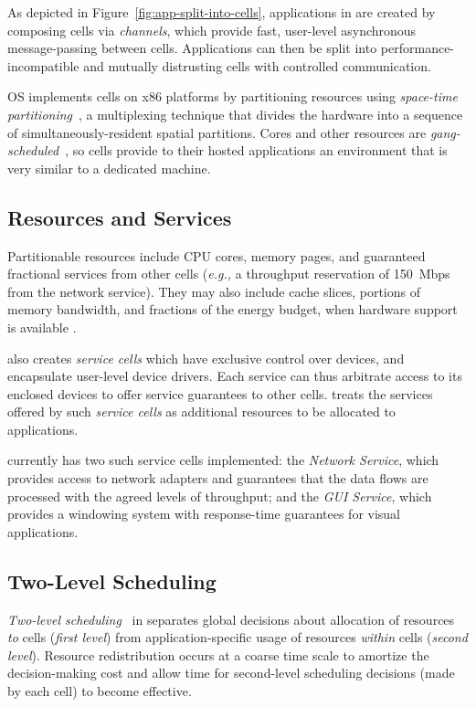 As depicted in Figure~\ref{fig:app-split-into-cells}, applications
in \tess are created by composing cells via \emph{channels}, which
provide fast, user-level asynchronous message-passing between cells.
Applications can then be split into performance-incompatible and
mutually distrusting cells with controlled communication. 


\tess OS implements cells on x86 platforms by partitioning resources
using \emph{space-time partitioning}~\cite{rushby99,lei03}, 
a multiplexing technique that divides the hardware into a sequence of
simultaneously-resident spatial partitions. 
Cores and other resources are
\textit{gang-scheduled}~\cite{gangsched1982,gangschedpatent}, so
cells provide to their hosted applications an environment that is very
similar to a dedicated machine.

\subsection{Resources and Services} \label{sec:soa} 
Partitionable resources include CPU cores, memory pages, and guaranteed
fractional services from other cells (\emph{e.g.,} a throughput reservation of 150~Mbps
from the network service).  
They may also include cache slices, portions of memory bandwidth, and fractions
of the energy budget, when hardware support is available
\cite{akesson07,lee08memqos,paolieri09,sanchez11}.

\tess also creates \emph{service cells} which have exclusive
control over devices, and encapsulate user-level device drivers. 
Each service can thus arbitrate access to its
enclosed devices to offer service guarantees to
other cells. \tess treats the services
offered by such \emph{service cells} as additional resources to be allocated to applications.

\tess currently has two such service cells implemented:
the \emph{Network Service}, which provides access to network adapters and
guarantees that the data flows are processed with the agreed levels of
throughput; and the \emph{GUI Service}, which provides a windowing system with
response-time guarantees for visual applications.  


\subsection{Two-Level Scheduling} 
\emph{Two-level scheduling}~\cite{leiner07,ober08} %
in \tess separates global decisions about allocation of resources \emph{to}
cells (\emph{first level}) from application-specific usage of resources
\emph{within} cells (\emph{second level}). 
Resource redistribution occurs at a coarse time scale to amortize the
decision-making cost and allow time for second-level scheduling decisions (made
by each cell) to become effective.

